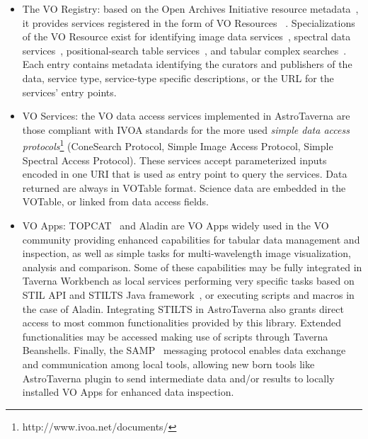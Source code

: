 \documentclass[final,authoryear,5p,times,twocolumn]{elsarticle}
\begin{document}
\begin{itemize}
\item The VO Registry: based on the Open Archives Initiative resource metadata~\citep{2002OAI-PMH},  it provides services registered in the form of VO Resources ~\citep{Hanisch2007}. Specializations of the VO Resource exist for identifying image data services~\citep[Simple Image Access Protocol;][]{Tody2009}, spectral data services~\citep[Simple Spectral Access Protocol;][]{Tody2012}, positional-search table services~\citep[ConeSearch Protocol;][]{Williams2008}, and tabular complex searches~\citep[Tabular Access Protocol;][]{Dowler2010}. Each entry contains metadata identifying the curators and publishers of the data, service type, service-type specific descriptions, or the URL for the services’ entry points. 

\item VO Services: the VO data access services implemented in AstroTaverna are those compliant with IVOA standards for the more used \textit{simple data access protocols}\footnote{http://www.ivoa.net/documents/} (ConeSearch Protocol, Simple Image Access Protocol, Simple Spectral Access Protocol). These services accept parameterized inputs encoded in one URI that is used as entry point to query the services. Data returned are always in VOTable format. Science data are embedded in the VOTable, or linked from data access fields.

\item VO Apps: TOPCAT~\citep{Taylor2011} and Aladin are VO Apps widely used in the VO community providing enhanced capabilities for tabular data management and inspection, as well as simple tasks for multi-wavelength image visualization, analysis and comparison. Some of these capabilities may be fully integrated in Taverna Workbench as local services performing very specific tasks based on STIL API and STILTS Java framework~\citep{Taylor2006,STILTS2011}, or executing scripts and macros in the case of Aladin. Integrating STILTS in AstroTaverna also grants direct access to most common functionalities provided by this library. Extended functionalities may be accessed making use of scripts through Taverna Beanshells. Finally, the SAMP~\citep[Simple Application Messaging Protocol;][]{Taylor2012} messaging protocol enables data exchange and communication among local tools, allowing new born tools like AstroTaverna plugin to send intermediate data and/or results to locally installed VO Apps for enhanced data inspection.
\end{itemize}
\end{document}
